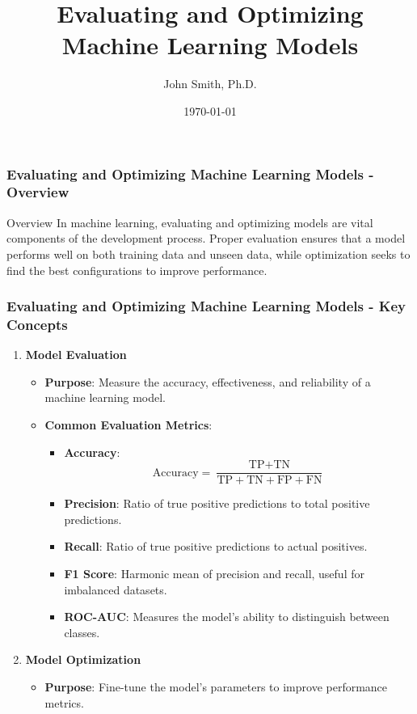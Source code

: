 \documentclass[aspectratio=169]{beamer}
\title[Evaluating and Optimizing ML Models]{Evaluating and Optimizing Machine Learning Models}
\author[J. Smith]{John Smith, Ph.D.}
\institute[University Name]{
  Department of Computer Science\\
  University Name\\
  \vspace{0.3cm}
  Email: email@university.edu\\
  Website: www.university.edu
}
\date{\today}
\begin{document}
\frame{\titlepage}

\begin{frame}[fragile]
    \frametitle{Evaluating and Optimizing Machine Learning Models - Overview}
    \begin{block}{Overview}
        In machine learning, evaluating and optimizing models are vital components of the development process. 
        Proper evaluation ensures that a model performs well on both training data and unseen data, 
        while optimization seeks to find the best configurations to improve performance.
    \end{block}
\end{frame}

\begin{frame}[fragile]
    \frametitle{Evaluating and Optimizing Machine Learning Models - Key Concepts}
    \begin{enumerate}
        \item \textbf{Model Evaluation}
            \begin{itemize}
                \item \textbf{Purpose}: Measure the accuracy, effectiveness, and reliability of a machine learning model.
                \item \textbf{Common Evaluation Metrics}:
                    \begin{itemize}
                        \item \textbf{Accuracy}:
                        \[
                        \text{Accuracy} = \frac{\text{TP} + \text{TN}}{\text{TP} + \text{TN} + \text{FP} + \text{FN}}
                        \]
                        \item \textbf{Precision}: Ratio of true positive predictions to total positive predictions.
                        \item \textbf{Recall}: Ratio of true positive predictions to actual positives.
                        \item \textbf{F1 Score}: Harmonic mean of precision and recall, useful for imbalanced datasets.
                        \item \textbf{ROC-AUC}: Measures the model's ability to distinguish between classes.
                    \end{itemize}
            \end{itemize}
        \item \textbf{Model Optimization}
            \begin{itemize}
                \item \textbf{Purpose}: Fine-tune the model’s parameters to improve performance metrics.

\end{itemize}
\end{enumerate}
\end{frame}
\end{document}
